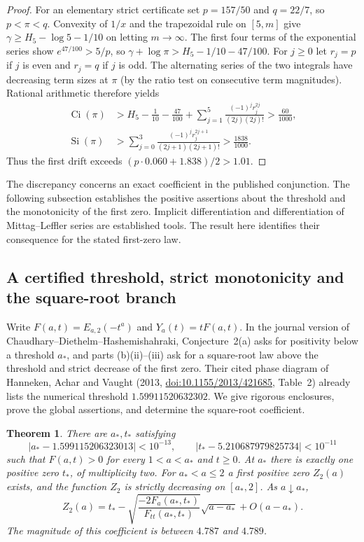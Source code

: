 \documentclass[11pt,a4paper]{article}
\newtheorem{theorem}{Theorem}[section]
\numberwithin{equation}{section}
\begin{document}
\begin{proof}
For an elementary strict certificate set $p=157/50$ and $q=22/7$, so
$p<\pi<q$. Convexity of $1/x$ and the trapezoidal rule on $[5,m]$
give $\gamma\ge H_5-\log 5-1/10$ on letting $m\to\infty$.
The first four terms of the exponential series show
$e^{47/100}>5/p$, so $\gamma+\log\pi>H_5-1/10-47/100$.
For $j\ge0$ let $r_j=p$ if $j$ is even and $r_j=q$ if $j$ is odd.
The alternating series of the two integrals have decreasing term sizes
at $\pi$ (by the ratio test on consecutive term magnitudes).
Rational arithmetic therefore yields
\begin{align*}
 \operatorname{Ci}(\pi)&>
 H_5-\frac1{10}-\frac{47}{100}
 +\sum_{j=1}^{5}\frac{(-1)^j r_j^{2j}}{(2j)(2j)!}
 >\frac{60}{1000},\\
 \operatorname{Si}(\pi)&>
 \sum_{j=0}^3\frac{(-1)^j r_j^{2j+1}}{(2j+1)(2j+1)!}
 >\frac{1838}{1000}.
\end{align*}
Thus the first drift exceeds $(p\cdot0.060+1.838)/2>1.01$.
\end{proof}
The discrepancy concerns an exact coefficient in the published
conjunction. The following subsection establishes the positive assertions about the
threshold and the monotonicity of the first zero.
Implicit differentiation and differentiation of Mittag--Leffler series
are established tools. The result here identifies their consequence
for the stated first-zero law.


\subsection{A certified threshold, strict monotonicity and the square-root branch}
\label{cdh:fold-sec}

Write $F(a,t)=E_{a,2}(-t^a)$ and $Y_a(t)=tF(a,t)$. In the journal
version of Chaudhary--Diethelm--Hashemishahraki, Conjecture~2(a) asks
for positivity below a threshold $a_*$, and parts (b)(ii)--(iii) ask
for a square-root law above the threshold and strict decrease of the
first zero. Their cited phase diagram of Hanneken, Achar and Vaught
(2013, \href{https://doi.org/10.1155/2013/421685}{doi:10.1155/2013/421685},
Table~2) already lists the numerical threshold $1.59911520632302$.
We give rigorous enclosures, prove the global assertions, and determine
the square-root coefficient.

\begin{theorem}\label{cdh:fold-thm}
There are $a_*,t_*$ satisfying
\[
 |a_*-1.599115206323013|<10^{-13},\qquad
 |t_*-5.210687979825734|<10^{-11}
\]
such that $F(a,t)>0$ for every $1<a<a_*$ and $t\ge0$.
At $a_*$ there is exactly one positive zero $t_*$, of multiplicity two.
For $a_*<a\le2$ a first positive zero $Z_2(a)$ exists, and the
function $Z_2$ is strictly decreasing on $[a_*,2]$. As $a\downarrow a_*$,
\[
 Z_2(a)=t_* -\sqrt{\frac{-2F_a(a_*,t_*)}{F_{tt}(a_*,t_*)}}
              \sqrt{a-a_*}+O(a-a_*).
\]
The magnitude of this coefficient is between $4.787$ and $4.789$.
\end{theorem}
\end{document}
